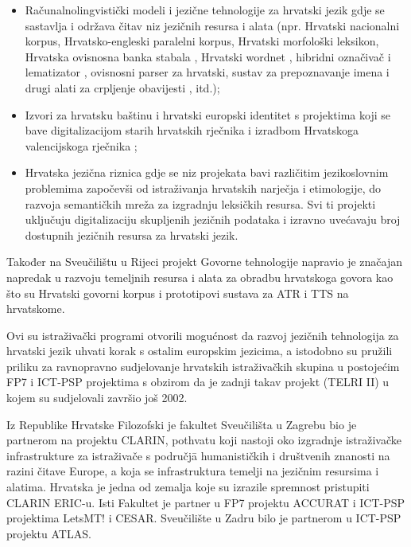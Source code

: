 \begin{multicols}{2}
\begin{itemize}
\item Računalnolingvistički modeli i jezične tehnologije za hrvatski jezik \cite{str30} gdje se sastavlja i održava čitav niz jezičnih resursa i alata (npr. Hrvatski nacionalni korpus, Hrvatsko-engleski paralelni korpus, Hrvatski morfološki leksikon, Hrvatska ovisnosna banka stabala \cite{str31}, Hrvatski wordnet \cite{str32}, hibridni označivač \cite{art8} i lematizator \cite{pro12}, ovisnosni parser za hrvatski, sustav za prepoznavanje imena i drugi alati za crpljenje obavijesti \cite{str33}, itd.);
\item Izvori za hrvatsku baštinu i hrvatski europski identitet \cite{str34} s projektima koji se bave digitalizacijom starih hrvatskih rječnika i izradbom Hrvatskoga valencijskoga rječnika \cite{art9};
\item Hrvatska jezična riznica \cite{str29} gdje se niz projekata bavi različitim jezikoslovnim problemima započevši od istraživanja hrvatskih narječja i etimologije, do razvoja semantičkih mreža za izgradnju leksičkih resursa. Svi ti projekti uključuju digitalizaciju skupljenih jezičnih podataka i izravno uvećavaju broj dostupnih jezičnih resursa za hrvatski jezik.
\end{itemize}

Također na Sveučilištu u Rijeci projekt Govorne tehnologije \cite{str38} napravio je značajan napredak u razvoju temeljnih resursa i alata za obradbu hrvatskoga govora kao što su Hrvatski govorni korpus i prototipovi sustava za ATR i TTS na hrvatskome.

Ovi su istraživački programi otvorili mogućnost da razvoj jezičnih tehnologija za hrvatski jezik uhvati korak s ostalim europskim jezicima, a istodobno su pružili priliku za ravnopravno sudjelovanje hrvatskih istraživačkih skupina u postojećim FP7 i ICT-PSP projektima s obzirom da je zadnji takav projekt (TELRI II) u kojem su sudjelovali završio još 2002.

Iz Republike Hrvatske Filozofski je fakultet Sveučilišta u Zagrebu bio je partnerom na projektu CLARIN, pothvatu koji nastoji oko izgradnje istraživačke infrastrukture za istraživače s područjā humanističkih i društvenih znanosti na razini čitave Europe, a koja se infrastruktura temelji na jezičnim resursima i alatima. Hrvatska je jedna od zemalja koje su izrazile spremnost pristupiti CLARIN ERIC-u. Isti Fakultet je partner u FP7 projektu ACCURAT i ICT-PSP projektima LetsMT! i CESAR. Sveučilište u Zadru bilo je partnerom u ICT-PSP projektu ATLAS.


\end{multicols}
